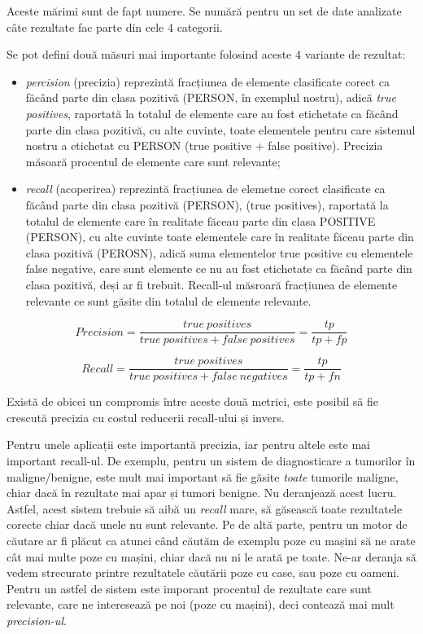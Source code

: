 Aceste mărimi sunt de fapt numere. Se numără pentru un set de date analizate câte rezultate fac parte din cele 4 categorii.

Se pot defini două măsuri mai importante folosind aceste 4 variante de rezultat:

\begin{itemize}
\item \textit{percision} (precizia) reprezintă fracțiunea de elemente clasificate corect ca făcând parte din clasa pozitivă (PERSON, în exemplul nostru), adică \textit{true positives}, raportată la totalul de elemente care au fost etichetate ca făcând parte din clasa pozitivă, cu alte cuvinte, toate elementele pentru care sistemul nostru a etichetat cu PERSON (true positive + false positive). Precizia măsoară procentul de elemente care sunt relevante;

\item \textit{recall} (acoperirea) reprezintă fracțiunea de elemetne corect clasificate ca făcând parte din clasa pozitivă (PERSON), (true positives), raportată la totalul de elemente care în realitate făceau parte din clasa POSITIVE (PERSON), cu alte cuvinte toate elementele care în realitate făceau parte din clasa pozitivă (PEROSN), adică suma elementelor true positive cu elementele false negative, care sunt elemente ce nu au fost etichetate ca făcând parte din clasa pozitivă, deși ar fi trebuit. Recall-ul măsroară fracțiunea de elemente relevante ce sunt găsite din totalul de elemente relevante.
\end{itemize}

\begin{equation}
Precision = \frac{true\ positives}{true\ positives + false\ positives} = \frac{tp}{tp + fp}
\end{equation}

\begin{equation}
Recall = \frac{true\ positives}{true\ positives + false\ negatives} = \frac{tp}{tp + fn}
\end{equation}

Există de obicei un compromis între aceste două metrici, este posibil să fie crescută 
precizia cu costul reducerii recall-ului și invers.

Pentru unele aplicații este importantă precizia, iar pentru altele este mai important recall-ul. De exemplu, pentru un sistem de diagnosticare a tumorilor în maligne/benigne, este mult mai important să fie găsite \textit{toate} tumorile maligne, chiar dacă în rezultate mai apar și tumori benigne. Nu deranjează acest lucru. Astfel, acest sistem trebuie să aibă un \textit{recall} mare, să găsească toate rezultatele corecte chiar dacă unele nu sunt relevante. Pe de altă parte, pentru un motor de căutare ar fi plăcut ca atunci când căutăm de exemplu poze cu mașini să ne arate cât mai multe poze cu mașini, chiar dacă nu ni le arată pe toate. Ne-ar deranja să vedem strecurate printre rezultatele căutării poze cu case, sau poze cu oameni. Pentru un astfel de sistem este imporant procentul de rezultate care sunt relevante, care ne interesează pe noi (poze cu mașini), deci contează mai mult \textit{precision-ul}.

